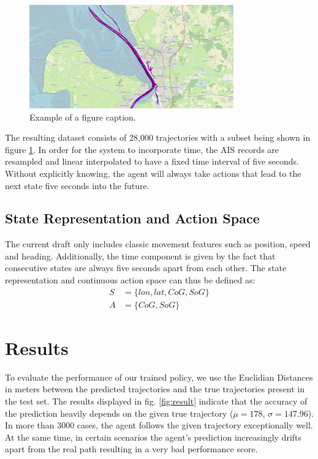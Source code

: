 \documentclass[conference]{IEEEtran}
\begin{document}
\begin{figure}[t]
\centerline{\includegraphics[width=250pt]{images/tracks.PNG}}
\caption{Example of a figure caption.}
\label{fig:tracks}
\end{figure}
The resulting dataset consists of 28,000 trajectories with a subset being shown in figure \ref{fig:tracks}. In order for the system to incorporate time, the AIS records are resampled and linear interpolated to have a fixed time interval of five seconds. Without explicitly knowing, the agent will always take actions that lead to the next state five seconds into the future.

\subsection{State Representation and Action Space}
The current draft only includes classic movement features such as position, speed and heading. Additionally, the time component is given by the fact that consecutive states are always five seconds apart from each other. The state representation and continuous action space can thus be defined as:
\begin{equation}
    \begin{aligned}
        S &= \{lon, lat, CoG, SoG\} \\
        A &= \{CoG, SoG\}
    \end{aligned}
\end{equation}

\section{Results}
To evaluate the performance of our trained policy, we use the Euclidian Distances in meters between the predicted trajectories and the true trajectories present in the test set. The results displayed in fig. \ref{fig:result} indicate that the accuracy of the prediction heavily depends on the given true trajectory ($\mu=178$, $\sigma=147.96$). In more than 3000 cases, the agent follows the given trajectory exceptionally well. At the same time, in certain scenarios the agent's prediction increasingly drifts apart from the real path resulting in a very bad performance score.
\end{document}
